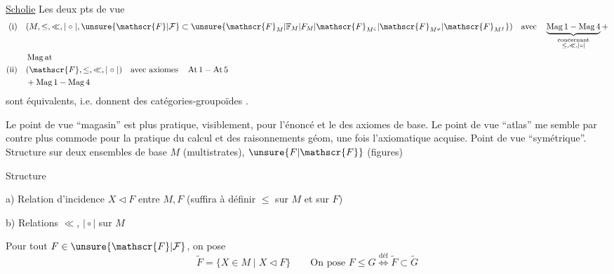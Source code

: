 \uline{Scholie} Les deux pts de vue
\[
\begin{aligned}
\text{(i)}\quad &(M,\leq,\ll,\mid\circ\mid,\unsure{\mathscr{F}|\mathcal{F}}\subset\unsure{\mathscr{F}_M|\mathbb{F}_M|F_M|\mathscr{F}_{M^{\zeta}}|\mathscr{F}_{M^{\varphi}}|\mathscr{F}_{M^f}})\quad\text{avec}\quad
\underbrace{\operatorname{Mag}1-\operatorname{Mag}4}_{\substack{\text{concernant}\\\leq,\ll,\mid\circ\mid}}+\\
&\operatorname{Mag\,at}\\
\text{(ii)}\quad &(\mathscr{F},\leq,\ll,\mid\circ\mid)\quad\text{avec axiomes}\quad\operatorname{At}1-\operatorname{At}5\\
&+\operatorname{Mag}1-\operatorname{Mag}4
\end{aligned}
\]
sont équivalents, i.e. donnent des catégories-groupoïdes .

Le point de vue ``magasin'' est plus pratique, visiblement, pour l'énoncé et le  des axiomes de base.
Le point de vue ``atlas'' me semble par contre plus commode pour la pratique du calcul et des raisonnements géom, une fois l'axiomatique acquise.
Point de vue ``symétrique''. Structure sur deux ensembles de base $M$ (multistrates), $\unsure{F|\mathscr{F}}$ (figures)

Structure\par
a) Relation d'incidence $X\triangleleft F$ entre $M,F$ (suffira à définir $\leq$ sur $M$ et sur $F$)

b) Relations $\ll$, $\mid\circ\mid$ sur $M$

Pour tout $F\in\unsure{\mathscr{F}|\mathcal{F}}$, on pose
\[
\widetilde{F}=\{X\in M\mid X\triangleleft F\}\qquad
\text{On pose }F\leq G\overset{\text{déf}}{\Longleftrightarrow}\widetilde{F}\subset\widetilde{G}
\]



